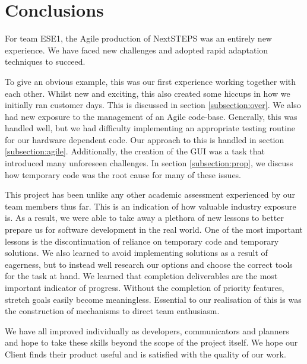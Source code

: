 \documentclass{l3proj}
\begin{document}

\section{Conclusions}
For team ESE1, the Agile production of NextSTEPS was an entirely new experience. We have faced new challenges and adopted rapid adaptation techniques to succeed. 

To give an obvious example, this was our first experience working together with each other. Whilst new and exciting, this also created some hiccups in how we initially ran customer days. This is discussed in section \ref{subsection:over}. We also had new exposure to the management of an Agile code-base. Generally, this was handled well, but we had difficulty implementing an appropriate testing routine for our hardware dependent code. Our approach to this is handled in section \ref{subsection:agile}. Additionally, the creation of the GUI was a task that introduced many unforeseen challenges. In section \ref{subsection:prop}, we discuss how temporary code was the root cause for many of these issues. 

This project has been unlike any other academic assessment experienced by our team members thus far. This is an indication of how valuable industry exposure is. As a result, we were able to take away a plethora of new lessons to better prepare us for software development in the real world. One of the most important lessons is the discontinuation of reliance on temporary code and temporary solutions. We also learned to avoid implementing solutions as a result of eagerness, but to instead well research our options and choose the correct tools for the task at hand. We learned that completion deliverables are the most important indicator of progress. Without the completion of priority features, stretch goals easily become meaningless. Essential to our realisation of this is was the construction of mechanisms to direct team enthusiasm. 

We have all improved individually as developers, communicators and planners and hope to take these skills beyond the scope of the project itself. We hope our Client finds their product useful and is satisfied with the quality of our work.

\newpage


\end{document}
